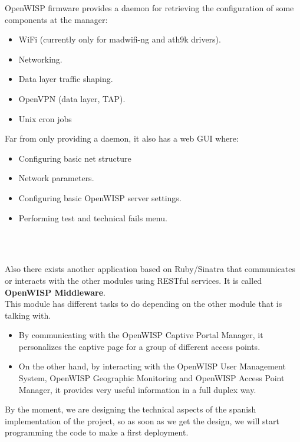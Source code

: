 \documentclass[draftclsnofoot,12pt,journal,onecolumn]{IEEEtran}
\begin{document}
\begin{enumerate}
OpenWISP firmware provides a daemon for retrieving the configuration of some components at the manager:

\begin{itemize}
\item WiFi (currently only for madwifi-ng and ath9k drivers).
\item Networking.
\item Data layer traffic shaping.
\item OpenVPN (data layer, TAP).
\item Unix cron jobs
\end{itemize}

Far from only providing a daemon, it also has a web GUI where:
\begin{itemize}
\item Configuring basic net structure
\item Network parameters.
\item Configuring basic OpenWISP server settings.
\item Performing test and technical fails menu.
\end{itemize}\\

\end{enumerate}\\

Also there exists another application based on Ruby/Sinatra that communicates or interacts with the other modules using RESTful services. It is called \textbf{OpenWISP Middleware}.\\This module has different tasks to do depending on the other module that is talking with.

\begin{itemize}

\item By communicating with the OpenWISP Captive Portal Manager, it personalizes the captive page for a group of different access points.\item On the other hand, by interacting with the OpenWISP User Management System, OpenWISP Geographic Monitoring and OpenWISP Access Point Manager, it provides very useful information in a full duplex way.

\end{itemize}

By the moment, we are designing the technical aspects of the spanish implementation of the project, so as soon as we get the design, we will start programming the code to make a first deployment.
\end{document}

